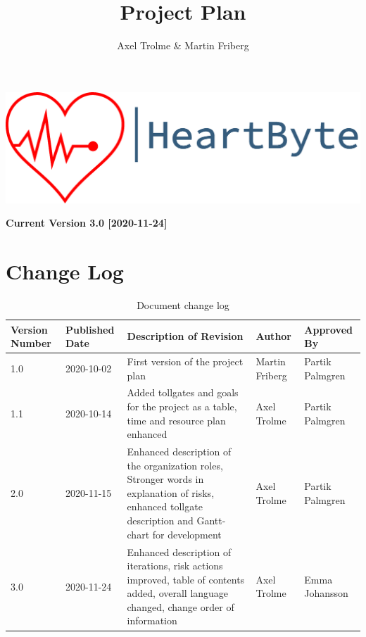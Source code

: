 \documentclass[12pt]{article}
\title{\Huge Project Plan}
\author{Axel Trolme \& Martin Friberg}
\begin{document}
\maketitle
\vfill
\includegraphics[width=\linewidth]{Pictures/logo_heartbyte_transparent_v_1_1 (1)}

\vfill
\begin{center}
        \textbf{\large Current Version 3.0 [2020-11-24]}
\end{center}
\clearpage

\section{Change Log}
	
\begin{table}[H]

\begin{center}
\begin{tabular}{ | m{2cm} |m{2cm} |m{5cm}|m{4cm}|m{3cm}| } 
\hline
{Version Number} & {Published Date} & {Description of Revision}& {Author}& {Approved By} \\ 
\hline
1.0 & 2020-10-02 & First version of the project plan & Martin Friberg & Partik Palmgren \\
\hline
1.1 & 2020-10-14 & Added tollgates and goals for the project as a table, time and resource plan enhanced & Axel Trolme & Partik Palmgren \\
\hline
2.0 & 2020-11-15 & Enhanced description of the organization roles, Stronger words in explanation of risks, enhanced tollgate description and Gantt-chart for development & Axel Trolme & Partik Palmgren\\ 
\hline
3.0 & 2020-11-24 & Enhanced description of iterations, risk actions improved, table of contents added, overall language changed, change order of information & Axel Trolme & Emma Johansson \\ 
\hline
\end{tabular}
\end{center}
\caption{\label{tab:changeLog}Document change log}
\end{table}
\clearpage
\tableofcontents
\clearpage
\end{document}
